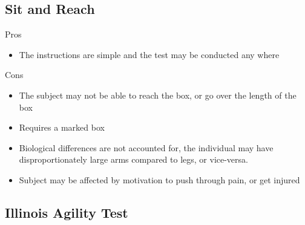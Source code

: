 \documentclass[12pt]{article}
\begin{document}
\subsection*{Sit and Reach}

\begin{minipage}[t]{0.5\textwidth}
    \begin{center}Pros\end{center}
    \begin{itemize}
        \item The instructions are simple and the test may be conducted any where
    \end{itemize}
\end{minipage}
\begin{minipage}[t]{0.5\textwidth}
    \begin{center}Cons\end{center}
    \begin{itemize}
        \item The subject may not be able to reach the box, or go over the length of the box
        \item Requires a marked box
        \item Biological differences are not accounted for, the individual may have disproportionately large arms compared to legs, or vice-versa.
        \item Subject may be affected by motivation to push through pain, or get injured
    \end{itemize}
\end{minipage}

\subsection*{Illinois Agility Test}
\end{document}
